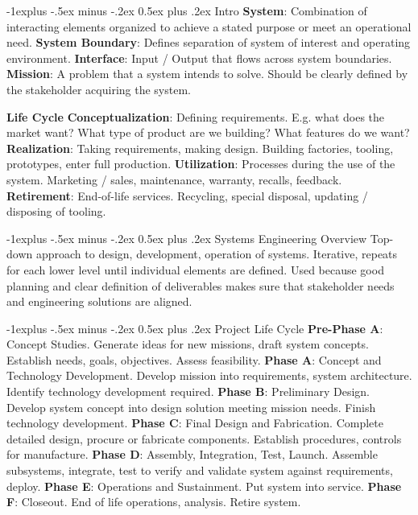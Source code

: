 \documentclass[letterpaper, 8pt]{extarticle}
\makeatletter
\renewcommand{\section}{\@startsection{section}{1}{0mm}%
                                {-1explus -.5ex minus -.2ex}%
                                {0.5ex plus .2ex}%
                                {\normalfont\normalsize\bfseries}}
\renewcommand{\subsection}{\@startsection{subsection}{2}{0mm}%
                                {-1explus -.5ex minus -.2ex}%
                                {0.5ex plus .2ex}%
                                {\normalfont\small\bfseries}}
\makeatother
\begin{document}
\begin{multicols*}{4}
\section{Intro}
\textbf{System}:
Combination of interacting elements organized
to achieve a stated purpose or meet an operational need.
\textbf{System Boundary}:
Defines separation of system of interest and operating environment.
\textbf{Interface}:
Input / Output that flows across system boundaries.
\textbf{Mission}:
A problem that a system intends to solve.
Should be clearly defined by the stakeholder acquiring the system.

\textbf{Life Cycle}
\textbf{Conceptualization}:
Defining requirements.
E.g. what does the market want?
What type of product are we building?
What features do we want?
\textbf{Realization}:
Taking requirements, making design.
Building factories, tooling, prototypes, enter full production.
\textbf{Utilization}:
Processes during the use of the system.
Marketing / sales, maintenance, warranty, recalls, feedback.
\textbf{Retirement}:
End-of-life services.
Recycling, special disposal, updating / disposing of tooling.

\subsection{Systems Engineering Overview}
Top-down approach to design, development, operation of systems.
Iterative, repeats for each lower level until individual elements are defined.
Used because good planning and clear definition of deliverables makes sure that
stakeholder needs and engineering solutions are aligned.

\subsection{Project Life Cycle}
\textbf{Pre-Phase A}:
Concept Studies.
Generate ideas for new missions, draft system concepts.
Establish needs, goals, objectives. Assess feasibility.
\textbf{Phase A}:
Concept and Technology Development.
Develop mission into requirements, system architecture.
Identify technology development required.
\textbf{Phase B}:
Preliminary Design.
Develop system concept into design solution meeting mission needs.
Finish technology development.
\textbf{Phase C}:
Final Design and Fabrication.
Complete detailed design, procure or fabricate components.
Establish procedures, controls for manufacture.
\textbf{Phase D}:
Assembly, Integration, Test, Launch.
Assemble subsystems, integrate,
test to verify and validate system against requirements, deploy.
\textbf{Phase E}:
Operations and Sustainment.
Put system into service.
\textbf{Phase F}:
Closeout.
End of life operations, analysis. Retire system.


\end{multicols*}
\end{document}
